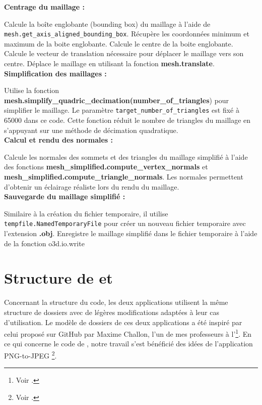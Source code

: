         \textbf{Centrage du maillage :}
        
        Calcule la boîte englobante (bounding box) du maillage à l'aide de \texttt{mesh.get\linebreak\_axis\_aligned\_bounding\_box}.
        Récupère les coordonnées minimum et maximum de la boite englobante.
        Calcule le centre de la boite englobante.
        Calcule le vecteur de translation nécessaire pour déplacer le maillage vers son centre.
        Déplace le maillage en utilisant la fonction \textbf{mesh.translate}.\\
        
        \textbf{Simplification des maillages :}
        
        Utilise la fonction \textbf{mesh.simplify\_quadric\_decimation(number\linebreak\_of\_triangles}) pour simplifier le maillage. Le paramètre \texttt{target\_number\linebreak\_of\_triangles} est fixé à 65000 dans ce code. Cette fonction réduit le nombre de triangles du maillage en s'appuyant sur une méthode de décimation quadratique.\\
        
        \textbf{Calcul et rendu des normales :}
        
        Calcule les normales des sommets et des triangles du maillage simplifié à l'aide des fonctions \textbf{mesh\_simplified.compute\_vertex\_normals} et \textbf{mesh\_simplified.compute\_\linebreak triangle\_normals}. Les normales permettent d'obtenir un éclairage réaliste lors du rendu du maillage.\\
        
        \textbf{Sauvegarde du maillage simplifié :}
         
        Similaire à la création du fichier temporaire, il utilise \texttt{tempfile.\linebreak NamedTemporaryFile} pour créer un nouveau fichier temporaire avec l'extension \textbf{.obj}.
        Enregistre le maillage simplifié dans le fichier temporaire à l'aide de la fonction o3d.io.write

    
    \section{Structure de \cvt et \msh}
    Concernant la structure du code, les deux applications utilisent la même structure de dossiers avec de légères modifications adaptées à leur cas d'utilisation. Le modèle de dossiers de ces deux applications a été inspiré par celui proposé sur GitHub par Maxime Challon, l'un de mes professeurs à l'\enc \footnote{Voir \cite{challon_coursm2tnah_flask}.}. En ce qui concerne le code de \cvt, notre travail s'est bénéficié des idées de l'application PNG-to-JPEG \footnote{Voir \cite{herrera_2023_png_to_jpeg}.}.

